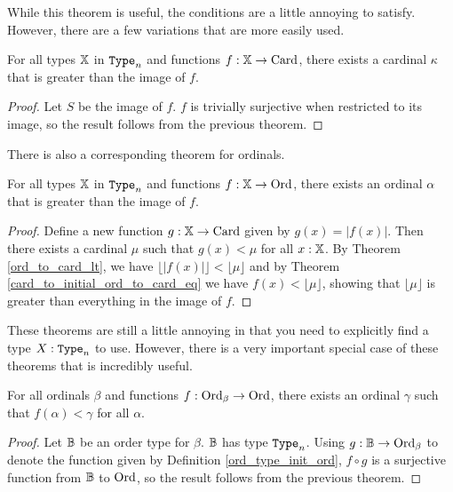 \documentclass[../../math.tex]{subfiles}
\begin{document}
While this theorem is useful, the conditions are a little annoying to satisfy.
However, there are a few variations that are more easily used.

\begin{theorem} \label{card_large}
    For all types $\mathbb{X}$ in $\Type_n$ and functions $f : \mathbb{X} \to \operatorname{Card}$, there
    exists a cardinal $\kappa$ that is greater than the image of $f$.
\end{theorem}
\begin{proof}
    Let $S$ be the image of $f$.  $f$ is trivially surjective when restricted to
    its image, so the result follows from the previous theorem.
\end{proof}

There is also a corresponding theorem for ordinals.

\begin{theorem} \label{ord_large}
    For all types $\mathbb{X}$ in $\Type_n$ and functions $f : \mathbb{X} \to \operatorname{Ord}$, there
    exists an ordinal $\alpha$ that is greater than the image of $f$.
\end{theorem}
\begin{proof}
    Define a new function $g : \mathbb{X} \to \operatorname{Card}$ given by $g(x) = |f(x)|$.  Then
    there exists a cardinal $\mu$ such that $g(x) < \mu$ for all $x : \mathbb{X}$.  By
    Theorem \ref{ord_to_card_lt}, we have $\lfloor | f(x) | \rfloor < \lfloor
    \mu \rfloor$ and by Theorem \ref{card_to_initial_ord_to_card_eq} we have
    $f(x) < \lfloor \mu \rfloor$, showing that $\lfloor \mu \rfloor$ is greater
    than everything in the image of $f$.
\end{proof}

These theorems are still a little annoying in that you need to explicitly find a
type $X : \Type_n$ to use.  However, there is a very important special case of
these theorems that is incredibly useful.

\begin{theorem} \label{ord_initial_small}
    For all ordinals $\beta$ and functions $f : \operatorname{Ord}_\beta \to \operatorname{Ord}$, there
    exists an ordinal $\gamma$ such that $f(\alpha) < \gamma$ for all $\alpha$.
\end{theorem}
\begin{proof}
    Let $\mathbb{B}$ be an order type for $\beta$.  $\mathbb{B}$ has type $\Type_n$.  Using $g :
    \mathbb{B} \to \operatorname{Ord}_\beta$ to denote the function given by Definition
    \ref{ord_type_init_ord}, $f \circ g$ is a surjective function from $\mathbb{B}$ to
    $\operatorname{Ord}$, so the result follows from the previous theorem.
\end{proof}
\end{document}
